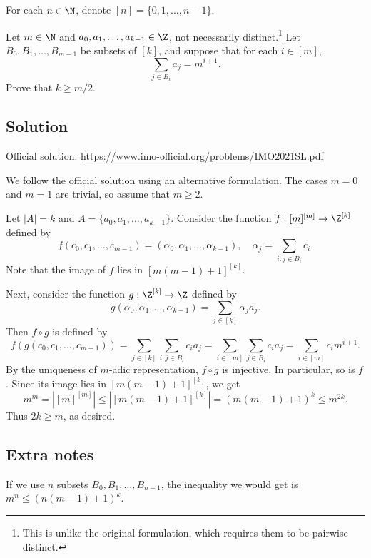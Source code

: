 For each $n \in \N$, denote $[n] = \{0, 1, \ldots, n - 1\}$.

Let $m \in \N$ and $a_0, a_1, \ldots, a_{k - 1} \in \Z$, not necessarily distinct.\footnote{This is unlike the original formulation, which requires them to be pairwise distinct.}
Let $B_0, B_1, \ldots, B_{m - 1}$ be subsets of $[k]$, and suppose that for each $i \in [m]$,
\[ \sum_{j \in B_i} a_j = m^{i + 1}. \]
Prove that $k \geq m/2$.



\subsection*{Solution}

Official solution: \url{https://www.imo-official.org/problems/IMO2021SL.pdf}

We follow the official solution using an alternative formulation.
The cases $m = 0$ and $m = 1$ are trivial, so assume that $m \geq 2$.

Let $|A| = k$ and $A = \{a_0, a_1, \ldots, a_{k - 1}\}$.
Consider the function $f : [m]^{[m]} \to \Z^{[k]}$ defined by
\[ f(c_0, c_1, \ldots, c_{m - 1}) = (\alpha_0, \alpha_1, \ldots, \alpha_{k - 1}), \quad \alpha_j = \sum_{i : j \in B_i} c_i. \]
Note that the image of $f$ lies in $[m(m - 1) + 1]^{[k]}$.

Next, consider the function $g : \Z^{[k]} \to \Z$ defined by
\[ g(\alpha_0, \alpha_1, \ldots, \alpha_{k - 1}) = \sum_{j \in [k]} \alpha_j a_j. \]
Then $f \circ g$ is defined by
\[ f(g(c_0, c_1, \ldots, c_{m - 1})) = \sum_{j \in [k]} \sum_{i : j \in B_i} c_i a_j = \sum_{i \in [m]} \sum_{j \in B_i} c_i a_j = \sum_{i \in [m]} c_i m^{i + 1}. \]
By the uniqueness of $m$-adic representation, $f \circ g$ is injective.
In particular, so is $f$.
Since its image lies in $[m(m - 1) + 1]^{[k]}$, we get
\[ m^m = \left|[m]^{[m]}\right| \leq \left|[m(m - 1) + 1]^{[k]}\right| = (m(m - 1) + 1)^k \leq m^{2k}. \]
Thus $2k \geq m$, as desired.



\subsection*{Extra notes}

If we use $n$ subsets $B_0, B_1, \ldots, B_{n - 1}$, the inequality we would get is $m^n \leq (n(m - 1) + 1)^k$.
